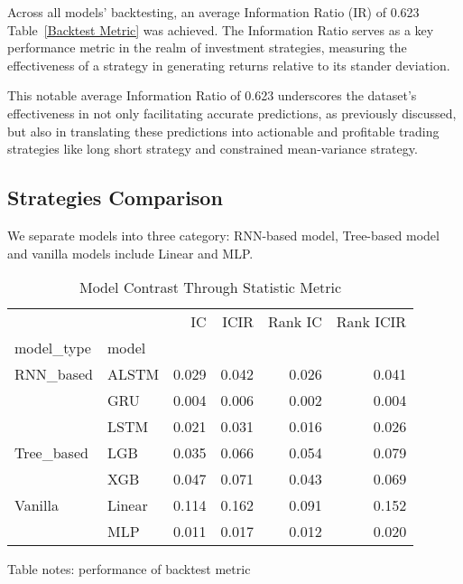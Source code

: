 \documentclass[10pt,letterpaper]{article}
\begin{document}
Across all models' backtesting, an average Information Ratio (IR) of 0.623 Table~\ref{Backtest Metric} was achieved. The Information Ratio serves as a key performance metric in the realm of investment strategies, measuring the effectiveness of a strategy in generating returns relative to its stander deviation.

This notable average Information Ratio of 0.623 underscores the dataset's effectiveness in not only facilitating accurate predictions, as previously discussed, but also in translating these predictions into actionable and profitable trading strategies like long short strategy and constrained mean-variance strategy.

\subsection*{Strategies Comparison}

We separate models into three category: RNN-based model, Tree-based model and vanilla models include Linear and MLP.

\begin{table}[!ht]
\centering
\caption{Model Contrast Through Statistic Metric}
\label{Model Contrast Through Statistic Metric}
\begin{tabular}{llrrrr}
\toprule
        &     &     IC &   ICIR &  Rank IC &  Rank ICIR \\
model\_type & model &        &        &          &            \\
\midrule
RNN\_based & ALSTM &  0.029 &  0.042 &    0.026 &      0.041 \\
        & GRU &  0.004 &  0.006 &    0.002 &      0.004 \\
        & LSTM &  0.021 &  0.031 &    0.016 &      0.026 \\
Tree\_based & LGB &  0.035 &  0.066 &    0.054 &      0.079 \\
        & XGB &  0.047 &  0.071 &    0.043 &      0.069 \\
Vanilla & Linear &  0.114 &  0.162 &    0.091 &      0.152 \\
        & MLP &  0.011 &  0.017 &    0.012 &      0.020 \\
\bottomrule
\end{tabular}




\begin{flushleft}
Table notes: performance of backtest metric
\end{flushleft}
\label{table1}

\end{table}
\end{document}

